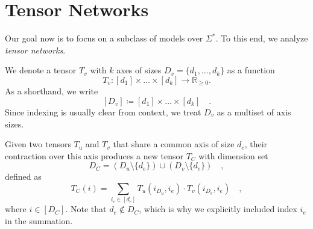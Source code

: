 \documentclass[../../main.tex]{subfiles}
\begin{document}
\section{Tensor Networks}
    Our goal now is to focus on a subclass of models over $\Sigma^*$. To this end, we analyze \emph{tensor networks}.

    \bigskip
    We denote a tensor \( T_v \) with \( k \) axes of sizes \( D_v = \{d_1, \dots, d_k\} \) as a function
    \[
    T_v : [d_1] \times \dots \times [d_k] \to \mathbb{R}_{\geq 0}.
    \]
    As a shorthand, we write
    \[
        [D_v] \coloneqq [d_1] \times \dots \times [d_k] \quad .
    \]
    Since indexing is usually clear from context, we treat \( D_v \) as a multiset of axis sizes.

    Given two tensors \( T_u \) and \( T_v \) that share a common axis of size \( d_e \), their contraction over this axis produces a new tensor \( T_C \) with dimension set
    \[
    D_C = (D_u \setminus \{d_e\}) \cup (D_v \setminus \{d_e\}) \quad ,
    \]
    defined as
    \[
    T_C(i) = \sum_{i_e \in [d_e]} T_u(i_{D_u}, i_{e}) \cdot T_v(i_{D_v}, i_{e}) \quad ,
    \]
    where \( i \in [D_C] \). Note that $d_e \not \in D_C$, which is why we explicitly included index $i_{e}$ in the summation.
\end{document}
